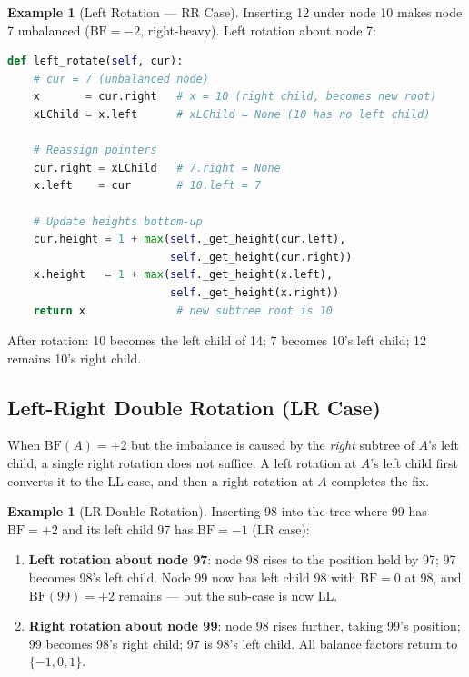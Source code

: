 \documentclass[11pt, a4paper, notitlepage]{report}
\theoremstyle{definition}
\theoremstyle{remark}
\theoremstyle{definition}
\newtheorem{example}[theorem]{Example}
\begin{document}
\begin{example}[Left Rotation --- RR Case]
\label{ex:left-rotate}
Inserting 12 under node 10 makes node 7 unbalanced ($\text{BF} = -2$, right-heavy).
Left rotation about node 7:

\begin{lstlisting}[language=Python]
def left_rotate(self, cur):
    # cur = 7 (unbalanced node)
    x       = cur.right   # x = 10 (right child, becomes new root)
    xLChild = x.left      # xLChild = None (10 has no left child)

    # Reassign pointers
    cur.right = xLChild   # 7.right = None
    x.left    = cur       # 10.left = 7

    # Update heights bottom-up
    cur.height = 1 + max(self._get_height(cur.left),
                         self._get_height(cur.right))
    x.height   = 1 + max(self._get_height(x.left),
                         self._get_height(x.right))
    return x              # new subtree root is 10
\end{lstlisting}

After rotation: 10 becomes the left child of 14; 7 becomes 10's left child; 12 remains
10's right child.
\end{example}

\subsection{Left-Right Double Rotation (LR Case)}
\label{subsec:lr-rotation}

When $\text{BF}(A) = +2$ but the imbalance is caused by the \emph{right} subtree of $A$'s
left child, a single right rotation does not suffice.  A left rotation at $A$'s left child
first converts it to the LL case, and then a right rotation at $A$ completes the fix.

\begin{example}[LR Double Rotation]
\label{ex:lr-rotate}
Inserting 98 into the tree where 99 has $\text{BF} = +2$ and its left child 97 has
$\text{BF} = -1$ (LR case):
\begin{enumerate}
  \item \textbf{Left rotation about node 97}: node 98 rises to the position held by 97;
        97 becomes 98's left child.  Node 99 now has left child 98 with $\text{BF}=0$ at
        98, and $\text{BF}(99) = +2$ remains --- but the sub-case is now LL.
  \item \textbf{Right rotation about node 99}: node 98 rises further, taking 99's position;
        99 becomes 98's right child; 97 is 98's left child.  All balance factors return to
        $\{-1, 0, 1\}$.
\end{enumerate}
\end{example}
\end{document}
